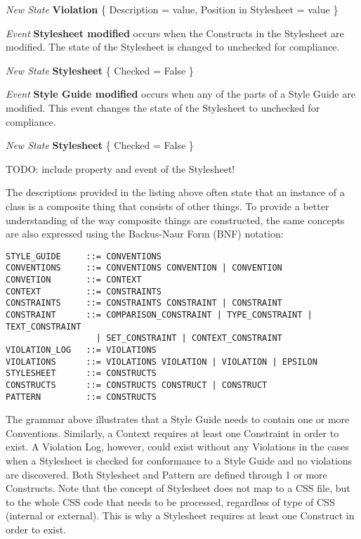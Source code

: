 \documentclass[parskip=full]{uvamscse}
\begin{document}
\begin{description}
\textit{New State} \textbf{Violation} \{ Description = value, Position in Stylesheet = value \}


\item\textit{Event} \textbf{Stylesheet modified} occurs when the Constructs in the Stylesheet are modified. The state of the Stylesheet is changed to unchecked for compliance.

\textit{New State} \textbf{Stylesheet} \{ Checked = False \}


\item\textit{Event} \textbf{Style Guide modified} occurs when any of the parts of a Style Guide are modified. This event changes the state of the Stylesheet to unchecked for compliance.

\textit{New State} \textbf{Stylesheet} \{ Checked = False \}

\end{description}

TODO: include property and event of the Stylesheet!

The descriptions provided in the listing above often state that an instance of a class is a
composite thing that consists of other things. To provide a better understanding of the way
composite things are constructed, the same concepts are also expressed using the Backus-Naur Form
(BNF) notation:

\begin{snippet}
\begin{verbatim}
STYLE_GUIDE     ::= CONVENTIONS
CONVENTIONS     ::= CONVENTIONS CONVENTION | CONVENTION 
CONVETION       ::= CONTEXT
CONTEXT         ::= CONSTRAINTS
CONSTRAINTS     ::= CONSTRAINTS CONSTRAINT | CONSTRAINT
CONSTRAINT      ::= COMPARISON_CONSTRAINT | TYPE_CONSTRAINT | TEXT_CONSTRAINT 
                  | SET_CONSTRAINT | CONTEXT_CONSTRAINT 
VIOLATION_LOG   ::= VIOLATIONS
VIOLATIONS      ::= VIOLATIONS VIOLATION | VIOLATION | EPSILON
STYLESHEET      ::= CONSTRUCTS
CONSTRUCTS      ::= CONSTRUCTS CONSTRUCT | CONSTRUCT
PATTERN         ::= CONSTRUCTS
\end{verbatim}
\end{snippet}

The grammar above illustrates that a Style Guide needs to contain one or more Conventions. Similarly,
a Context requires at least one Constraint in order to exist. A Violation Log, however, could exist
without any Violations in the cases when a Stylesheet is checked for conformance to a Style Guide
and no violations are discovered. Both Stylesheet and Pattern are defined through 1 or more
Constructs. Note that the concept of Stylesheet does not map to a CSS file, but to the whole CSS
code that needs to be processed, regardless of type of CSS (internal or external). This is why a
Stylesheet requires at least one Construct in order to exist.
\end{document}
